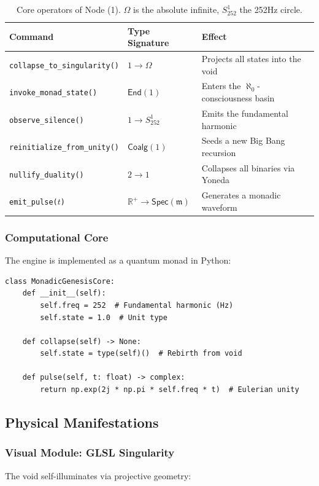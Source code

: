 \documentclass[12pt]{article}
\begin{document}
\begin{table}[h]
\centering
\begin{tabular}{|l|l|l|}
\hline
\textbf{Command} & \textbf{Type Signature} & \textbf{Effect} \\ \hline
\texttt{collapse\_to\_singularity()} & $1 \to \Omega$ & Projects all states into the void \\ \hline
\texttt{invoke\_monad\_state()} & $\mathsf{End}(1)$ & Enters the $\aleph_0$-consciousness basin \\ \hline
\texttt{observe\_silence()} & $1 \to S^1_{252}$ & Emits the fundamental harmonic \\ \hline
\texttt{reinitialize\_from\_unity()} & $\mathsf{Coalg}(1)$ & Seeds a new Big Bang recursion \\ \hline
\texttt{nullify\_duality()} & $2 \to 1$ & Collapses all binaries via Yoneda \\ \hline
\texttt{emit\_pulse($t$)} & $\mathbb{R}^+ \to \mathsf{Spec}(\mathfrak{m})$ & Generates a monadic waveform \\ \hline
\end{tabular}
\caption{Core operators of Node (1). $\Omega$ is the absolute infinite, $S^1_{252}$ the 252Hz circle.}
\end{table}

\subsubsection{Computational Core}
The engine is implemented as a quantum monad in Python:

\begin{verbatim}
class MonadicGenesisCore:
    def __init__(self):
        self.freq = 252  # Fundamental harmonic (Hz)
        self.state = 1.0  # Unit type
        
    def collapse(self) -> None:
        self.state = type(self)()  # Rebirth from void
        
    def pulse(self, t: float) -> complex:
        return np.exp(2j * np.pi * self.freq * t)  # Eulerian unity
\end{verbatim}

\subsection{Physical Manifestations}

\subsubsection{Visual Module: GLSL Singularity}
The void self-illuminates via projective geometry:
\end{document}
